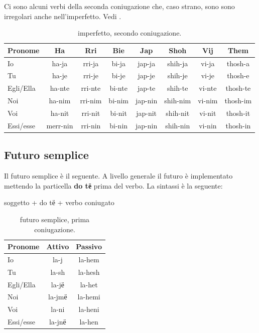 Ci sono alcuni verbi della seconda coniugazione che, caso strano, sono sono irregolari anche nell'imperfetto. Vedi .

\begin{table}[H]
    \centering
    \begin{tabular}{lccccccc}
        \toprule
        Pronome     &   Ha      & Rri   & Bie   & Jap   & Shoh      & Vij   & Them \\
        \midrule
        Io          &   ha-ja & rri-ja & bi-ja & jap-ja & shih-ja & vi-ja & thosh-a \\
        Tu          &   ha-je & rri-je & bi-je & jap-je & shih-je & vi-je & thosh-e \\
        Egli/Ella   &   ha-nte & rri-nte & bi-nte & jap-te & shih-te & vi-nte & thosh-te \\
        Noi         &   ha-nim & rri-nim & bi-nim & jap-nin & shih-nim & vi-nim & thosh-im \\
        Voi         &   ha-nit & rri-nit & bi-nit & jap-nit & shih-nit & vi-nit & thosh-it \\
        Essi/esse   &   merr-nin & rri-nin & bi-nin & jap-nin & shih-nin & vi-nin & thosh-in \\
        \bottomrule
    \end{tabular}
    \caption{imperfetto, secondo coniugazione.}
    \label{tbl:verb:secondaconiugazione:imperfetto}
\end{table}

\subsection{Futuro semplice}

Il futuro semplice\cite{vocedellaquila:futurosemplice} è il seguente. A livello generale il futuro è implementato mettendo la particella \textbf{do tё} prima del verbo. La sintassi è la seguente:

\begin{center}
    soggetto + do tё + verbo coniugato
\end{center}

\begin{table}[H]
    \centering
    \begin{tabular}{lcc}
        \toprule
        Pronome     &   Attivo & Passivo \\
        \midrule
        Io          &   la-j & la-hem \\
        Tu          &   la-sh & la-hesh \\
        Egli/Ella   &   la-jё & la-het \\
        Noi         &   la-jmё & la-hemi \\
        Voi         &   la-ni & la-heni \\
        Essi/esse   &   la-jnё & la-hen \\
        \bottomrule
    \end{tabular}
    \caption{futuro semplice, prima coniugazione.}
    \label{tbl:verb:primaconiugazione:futurosemplice}
\end{table}

